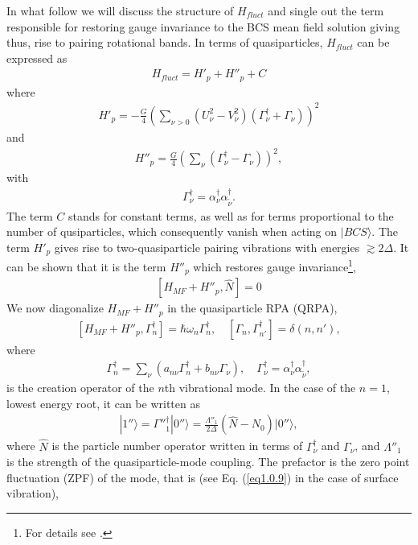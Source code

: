 \documentclass[a4paper,11pt]{book}
\numberwithin{equation}{section}
\numberwithin{figure}{section}
\numberwithin{table}{section}
\newcommand{\ket}[1]{|{#1} \rangle }
\begin{document}
In what follow we will discuss the structure of $H_{fluct}$ and single out the term responsible for restoring gauge invariance to the BCS mean field solution giving thus, rise to pairing rotational bands. In terms of quasiparticles, $H_{fluct}$ can be expressed  as
\begin{align}\label{eq0.1.91}
H_{fluct}=H'_p+H''_p+C
\end{align}
where 
\begin{align}\label{eq0.1.92}
H'_p=-\frac{G}{4}\left(\sum_{\nu>0}\left(U^2_\nu-V^2_\nu\right)\left(\Gamma^\dagger_\nu+\Gamma_\nu\right)\right)^2
\end{align}
and
\begin{align}\label{eq0.1.93}
H''_p=\frac{G}{4}\left(\sum_{\nu}\left(\Gamma^\dagger_\nu-\Gamma_\nu\right)\right)^2,
\end{align}
with
\begin{align}\label{eq0.1.94}
\Gamma^\dagger_\nu=\alpha^\dagger_\nu\alpha_{\tilde \nu}^\dagger.
\end{align}
The term $C$ stands for constant terms, as well as for terms proportional to the number of qusiparticles, which consequently vanish when acting on $\ket{BCS}$. The term $H'_p$ gives rise to two-quasiparticle pairing vibrations with energies $\gtrsim2\Delta$. It can be shown that it is the term $H''_p$ which restores gauge invariance\footnote{For details see \cite{Brink:05}.},
\begin{align}\label{eq0.1.95}
\left[H_{MF}+H''_p,\hat N\right]=0
\end{align}
We now diagonalize $H_{MF}+H''_p$ in the quasiparticle RPA (QRPA),
\begin{align}\label{eq0.1.96}
\left[H_{MF}+H''_p,\Gamma^\dagger_n\right]=\hbar\omega_n\Gamma^\dagger_n,\quad \left[\Gamma_n,\Gamma^\dagger_{n'}\right]=\delta(n,n'),
\end{align}
where
\begin{align}\label{eq0.1.97}
\Gamma^\dagger_n=\sum_{\nu}\left(a_{n\nu}\Gamma^\dagger_n+b_{n\nu}\Gamma_\nu\right),\quad \Gamma^\dagger_\nu=\alpha^\dagger_\nu\alpha^\dagger_{\tilde\nu},	
\end{align}
is the creation operator of the $n$th vibrational mode. In the case of the $n=1$, lowest energy root, it can be written as
\begin{align}\label{eq0.1.98}
\ket{1''}=\Gamma''^\dagger_1\ket{0''}=\frac{\Lambda''_1}{2\Delta}(\hat N-N_0)\ket{0''},	
\end{align}
where $\hat N$ is the particle number operator written in terms of $\Gamma^\dagger_\nu$ and $\Gamma_\nu$, and $\Lambda''_1$ is the strength of the quasiparticle-mode coupling. The prefactor is the zero point fluctuation (ZPF) of the mode, that is (see Eq. (\ref{eq1.0.9}) in the case of surface vibration),
\end{document}

